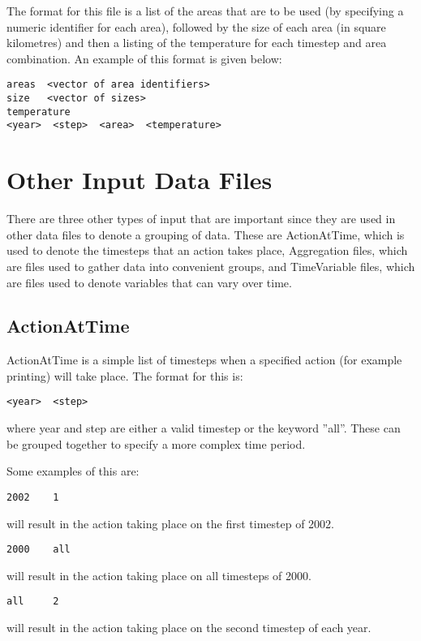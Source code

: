 \documentclass [a4paper, 10pt]{book}
\begin{document}
\bigskip
The format for this file is a list of the areas that are to be used (by specifying a numeric identifier for each area), followed by the size of each area (in square kilometres) and then a listing of the temperature for each timestep and area combination.  An example of this format is given below:

{\small\begin{verbatim}
areas  <vector of area identifiers>
size   <vector of sizes>
temperature
<year>  <step>  <area>  <temperature>
\end{verbatim}}

\section{Other Input Data Files}\label{sec:otherinputfile}
There are three other types of input that are important since they are used in other data files to denote a grouping of data.  These are ActionAtTime, which is used to denote the timesteps that an action takes place, Aggregation files, which are files used to gather data into convenient groups, and TimeVariable files, which are files used to denote variables that can vary over time.

\subsection{ActionAtTime}
ActionAtTime is a simple list of timesteps when a specified action (for example printing) will take place.  The format for this is:

{\small\begin{verbatim}
<year>  <step>
\end{verbatim}}

where year and step are either a valid timestep or the keyword ''all''.  These can be grouped together to specify a more complex time period.\newline

Some examples of this are:
{\small\begin{verbatim}
2002    1
\end{verbatim}}
will result in the action taking place on the first timestep of 2002.

{\small\begin{verbatim}
2000    all
\end{verbatim}}
will result in the action taking place on all timesteps of 2000.

{\small\begin{verbatim}
all     2
\end{verbatim}}
will result in the action taking place on the second timestep of each year.
\end{document}
